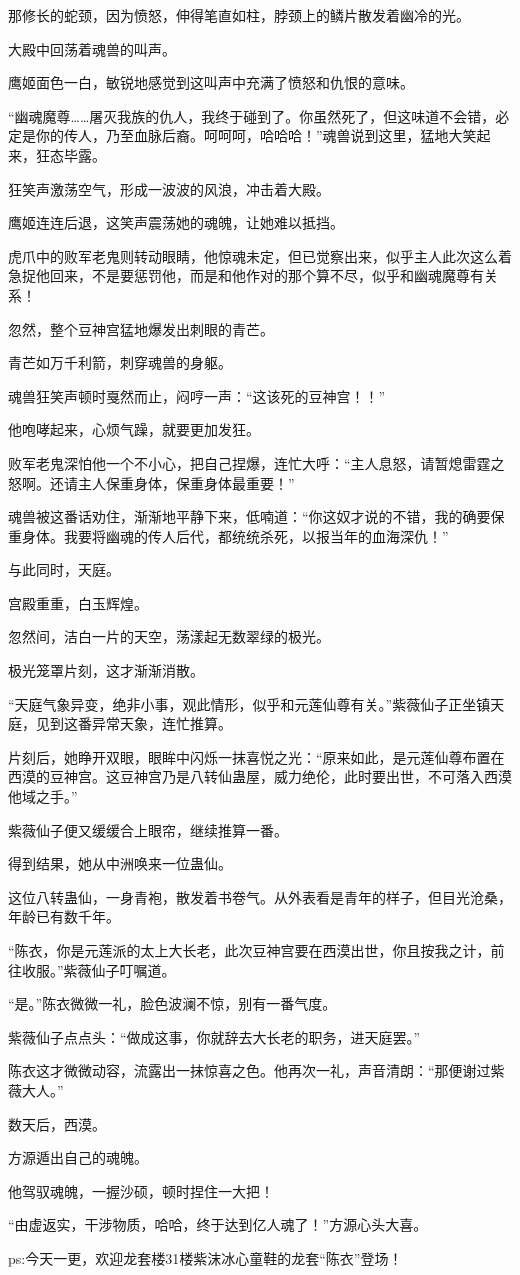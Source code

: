 \begin{this_body}
那修长的蛇颈，因为愤怒，伸得笔直如柱，脖颈上的鳞片散发着幽冷的光。

大殿中回荡着魂兽的叫声。

鹰姬面色一白，敏锐地感觉到这叫声中充满了愤怒和仇恨的意味。

“幽魂魔尊……屠灭我族的仇人，我终于碰到了。你虽然死了，但这味道不会错，必定是你的传人，乃至血脉后裔。呵呵呵，哈哈哈！”魂兽说到这里，猛地大笑起来，狂态毕露。

狂笑声激荡空气，形成一波波的风浪，冲击着大殿。

鹰姬连连后退，这笑声震荡她的魂魄，让她难以抵挡。

虎爪中的败军老鬼则转动眼睛，他惊魂未定，但已觉察出来，似乎主人此次这么着急捉他回来，不是要惩罚他，而是和他作对的那个算不尽，似乎和幽魂魔尊有关系！

忽然，整个豆神宫猛地爆发出刺眼的青芒。

青芒如万千利箭，刺穿魂兽的身躯。

魂兽狂笑声顿时戛然而止，闷哼一声：“这该死的豆神宫！！”

他咆哮起来，心烦气躁，就要更加发狂。

败军老鬼深怕他一个不小心，把自己捏爆，连忙大呼：“主人息怒，请暂熄雷霆之怒啊。还请主人保重身体，保重身体最重要！”

魂兽被这番话劝住，渐渐地平静下来，低喃道：“你这奴才说的不错，我的确要保重身体。我要将幽魂的传人后代，都统统杀死，以报当年的血海深仇！”

与此同时，天庭。

宫殿重重，白玉辉煌。

忽然间，洁白一片的天空，荡漾起无数翠绿的极光。

极光笼罩片刻，这才渐渐消散。

“天庭气象异变，绝非小事，观此情形，似乎和元莲仙尊有关。”紫薇仙子正坐镇天庭，见到这番异常天象，连忙推算。

片刻后，她睁开双眼，眼眸中闪烁一抹喜悦之光：“原来如此，是元莲仙尊布置在西漠的豆神宫。这豆神宫乃是八转仙蛊屋，威力绝伦，此时要出世，不可落入西漠他域之手。”

紫薇仙子便又缓缓合上眼帘，继续推算一番。

得到结果，她从中洲唤来一位蛊仙。

这位八转蛊仙，一身青袍，散发着书卷气。从外表看是青年的样子，但目光沧桑，年龄已有数千年。

“陈衣，你是元莲派的太上大长老，此次豆神宫要在西漠出世，你且按我之计，前往收服。”紫薇仙子叮嘱道。

“是。”陈衣微微一礼，脸色波澜不惊，别有一番气度。

紫薇仙子点点头：“做成这事，你就辞去大长老的职务，进天庭罢。”

陈衣这才微微动容，流露出一抹惊喜之色。他再次一礼，声音清朗：“那便谢过紫薇大人。”

数天后，西漠。

方源遁出自己的魂魄。

他驾驭魂魄，一握沙硕，顿时捏住一大把！

“由虚返实，干涉物质，哈哈，终于达到亿人魂了！”方源心头大喜。

ps:今天一更，欢迎龙套楼31楼紫沫冰心童鞋的龙套“陈衣”登场！

\end{this_body}

